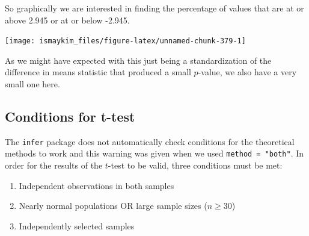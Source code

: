 \documentclass[12pt, krantz2,]{krantz}
\makeatletter
\newenvironment{Shaded}{\begin{snugshade}}{\end{snugshade}}
\newcommand{\DataTypeTok}[1]{\textcolor[rgb]{0.27,0.27,0.27}{#1}}
\newcommand{\KeywordTok}[1]{\textcolor[rgb]{0.27,0.27,0.27}{\textbf{#1}}}
\newcommand{\NormalTok}[1]{#1}
\newcommand{\OperatorTok}[1]{\textcolor[rgb]{0.43,0.43,0.43}{\textbf{#1}}}
\newcommand{\StringTok}[1]{\textcolor[rgb]{0.5,0.5,0.5}{#1}}
\providecommand{\tightlist}{%
  \setlength{\itemsep}{0pt}\setlength{\parskip}{0pt}}
\newenvironment{kframe}{%
\medskip{}
\setlength{\fboxsep}{.8em}
 \def\at@end@of@kframe{}%
 \ifinner\ifhmode%
  \def\at@end@of@kframe{\end{minipage}}%
  \begin{minipage}{\columnwidth}%
 \fi\fi%
 \def\FrameCommand##1{\hskip\@totalleftmargin \hskip-\fboxsep
 \colorbox{shadecolor}{##1}\hskip-\fboxsep
     \hskip-\linewidth \hskip-\@totalleftmargin \hskip\columnwidth}%
 \MakeFramed {\advance\hsize-\width
   \@totalleftmargin\z@ \linewidth\hsize
   \@setminipage}}%
 {\par\unskip\endMakeFramed%
 \at@end@of@kframe}
\renewenvironment{Shaded}{\begin{kframe}}{\end{kframe}}
\makeatother
\begin{document}
\begin{Shaded}
\end{Shaded}

So graphically we are interested in finding the percentage of values that are at or above 2.945 or at or below -2.945.

\begin{Shaded}
\end{Shaded}

\begin{center}\texttt{[image: ismaykim\_files/figure-latex/unnamed-chunk-379-1]} \end{center}

As we might have expected with this just being a standardization of the difference in means statistic that produced a small \(p\)-value, we also have a very small one here.

\hypertarget{conditions-for-t-test}{%
\subsection{Conditions for t-test}\label{conditions-for-t-test}}

The \texttt{infer} package does not automatically check conditions for the theoretical methods to work and this warning was given when we used \texttt{method\ =\ "both"}. In order for the results of the \(t\)-test to be valid, three conditions must be met:

\begin{enumerate}
\def\labelenumi{\arabic{enumi}.}
\tightlist
\item
  Independent observations in both samples
\item
  Nearly normal populations OR large sample sizes (\(n \ge 30\))
\item
  Independently selected samples
\end{enumerate}
\end{document}
